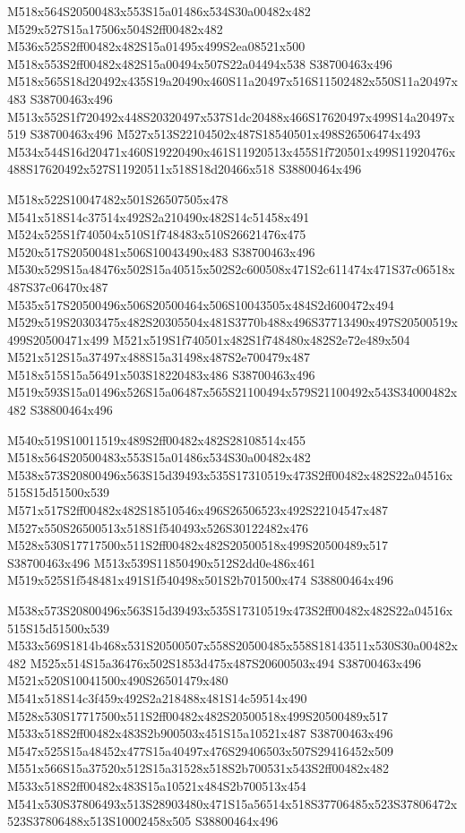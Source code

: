 \documentclass{article}
\begin{document}
\begin{multicols}{2}
M518x564S20500483x553S15a01486x534S30a00482x482 M529x527S15a17506x504S2ff00482x482 M536x525S2ff00482x482S15a01495x499S2ea08521x500 M518x553S2ff00482x482S15a00494x507S22a04494x538 S38700463x496 M518x565S18d20492x435S19a20490x460S11a20497x516S11502482x550S11a20497x483 S38700463x496 M513x552S1f720492x448S20320497x537S1dc20488x466S17620497x499S14a20497x519 S38700463x496 M527x513S22104502x487S18540501x498S26506474x493 M534x544S16d20471x460S19220490x461S11920513x455S1f720501x499S11920476x488S17620492x527S11920511x518S18d20466x518 S38800464x496

M518x522S10047482x501S26507505x478 M541x518S14c37514x492S2a210490x482S14c51458x491 M524x525S1f740504x510S1f748483x510S26621476x475 M520x517S20500481x506S10043490x483 S38700463x496 M530x529S15a48476x502S15a40515x502S2c600508x471S2c611474x471S37c06518x487S37c06470x487 M535x517S20500496x506S20500464x506S10043505x484S2d600472x494 M529x519S20303475x482S20305504x481S3770b488x496S37713490x497S20500519x499S20500471x499 M521x519S1f740501x482S1f748480x482S2e72e489x504 M521x512S15a37497x488S15a31498x487S2e700479x487 M518x515S15a56491x503S18220483x486 S38700463x496 M519x593S15a01496x526S15a06487x565S21100494x579S21100492x543S34000482x482 S38800464x496

M540x519S10011519x489S2ff00482x482S28108514x455 M518x564S20500483x553S15a01486x534S30a00482x482 M538x573S20800496x563S15d39493x535S17310519x473S2ff00482x482S22a04516x515S15d51500x539 M571x517S2ff00482x482S18510546x496S26506523x492S22104547x487 M527x550S26500513x518S1f540493x526S30122482x476 M528x530S17717500x511S2ff00482x482S20500518x499S20500489x517 S38700463x496 M513x539S11850490x512S2dd0e486x461 M519x525S1f548481x491S1f540498x501S2b701500x474 S38800464x496

M538x573S20800496x563S15d39493x535S17310519x473S2ff00482x482S22a04516x515S15d51500x539 M533x569S1814b468x531S20500507x558S20500485x558S18143511x530S30a00482x482 M525x514S15a36476x502S1853d475x487S20600503x494 S38700463x496 M521x520S10041500x490S26501479x480 M541x518S14c3f459x492S2a218488x481S14c59514x490 M528x530S17717500x511S2ff00482x482S20500518x499S20500489x517 M533x518S2ff00482x483S2b900503x451S15a10521x487 S38700463x496 M547x525S15a48452x477S15a40497x476S29406503x507S29416452x509 M551x566S15a37520x512S15a31528x518S2b700531x543S2ff00482x482 M533x518S2ff00482x483S15a10521x484S2b700513x454 M541x530S37806493x513S28903480x471S15a56514x518S37706485x523S37806472x523S37806488x513S10002458x505 S38800464x496


\end{multicols}
\end{document}
